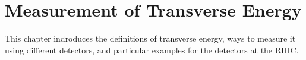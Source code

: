 \chapter{Measurement of Transverse Energy} \label{ch:measurement}




This chapter indroduces the definitions of transverse energy, ways to measure it using different detectors, and particular examples for the detectors at the RHIC.

